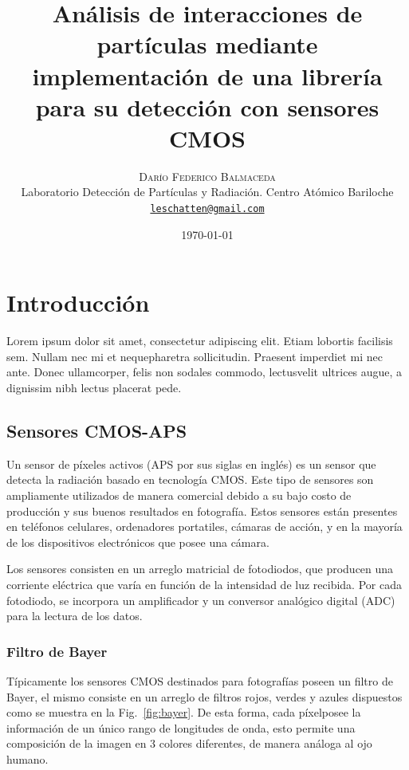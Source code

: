 \documentclass[twoside,twocolumn]{article}
\title{Análisis de interacciones de partículas mediante implementación de una librería para su detección con sensores CMOS}
\author{%
    \textsc{Darío Federico Balmaceda} \\[1ex]     %
    \normalsize Laboratorio Detección de Partículas y Radiación. Centro Atómico Bariloche \\                                    %
    \normalsize \href{mailto:leschatten@gmail.com}{\texttt{leschatten@gmail.com}}                   %
  }
\date{\today}                                                                %
\begin{document}
  
  \maketitle              %
  
  \section{Introducción}
    \lettrine[nindent=0em,lines=3]{L} orem ipsum dolor sit amet, consectetur adipiscing elit.
      Etiam lobortis facilisis sem. Nullam nec mi et nequepharetra sollicitudin.
      Praesent imperdiet mi nec ante. Donec ullamcorper, felis non sodales commodo,
      lectusvelit ultrices augue, a dignissim nibh lectus placerat pede.

    \subsection{Sensores CMOS-APS}
      Un sensor de píxeles activos (APS por sus siglas en inglés) es un sensor que detecta la radiación basado en tecnología CMOS.
      Este tipo de sensores son ampliamente utilizados de manera comercial debido a su
      bajo costo de producción y sus buenos resultados en fotografía.
      Estos sensores están presentes en teléfonos celulares, ordenadores portatiles, cámaras de acción,
      y en la mayoría de los dispositivos electrónicos que posee una cámara.

      Los sensores consisten en un arreglo matricial de fotodiodos, 
      que producen una corriente eléctrica que varía en función de la intensidad de luz recibida.
      Por cada fotodiodo, se incorpora un amplificador y un conversor analógico digital (ADC) para la lectura de los datos.

    \subsubsection{Filtro de Bayer}

      Típicamente los sensores CMOS destinados para fotografías poseen un filtro de Bayer, 
      el mismo consiste en un arreglo de filtros rojos, verdes y azules dispuestos como se muestra en la Fig.~\ref{fig:bayer}.
      De esta forma, cada píxelposee la información de un único rango de longitudes de onda, 
      esto permite una composición de la imagen en 3 colores diferentes, de manera análoga al ojo humano.
\end{document}
